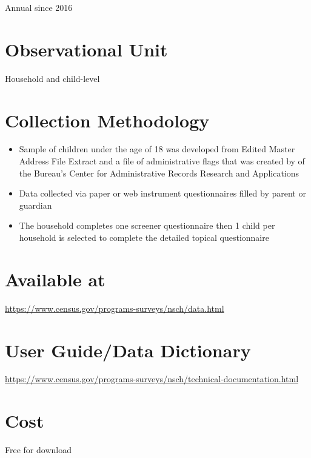 \documentclass[
]{book}
\providecommand{\tightlist}{%
  \setlength{\itemsep}{0pt}\setlength{\parskip}{0pt}}
\begin{document}
Annual since 2016

\hypertarget{observational-unit-61}{%
\section{Observational Unit}\label{observational-unit-61}}

Household and child-level

\hypertarget{collection-methodology-61}{%
\section{Collection Methodology}\label{collection-methodology-61}}

\begin{itemize}
\tightlist
\item
  Sample of children under the age of 18 was developed from Edited Master Address File Extract and a file of administrative flags that was created by of the Bureau's Center for Administrative Records Research and Applications
\item
  Data collected via paper or web instrument questionnaires filled by parent or guardian
\item
  The household completes one screener questionnaire then 1 child per household is selected to complete the detailed topical questionnaire
\end{itemize}

\hypertarget{available-at-61}{%
\section{Available at}\label{available-at-61}}

\url{https://www.census.gov/programs-surveys/nsch/data.html}

\hypertarget{user-guidedata-dictionary-61}{%
\section{User Guide/Data Dictionary}\label{user-guidedata-dictionary-61}}

\url{https://www.census.gov/programs-surveys/nsch/technical-documentation.html}

\hypertarget{cost-61}{%
\section{Cost}\label{cost-61}}

Free for download
\end{document}
